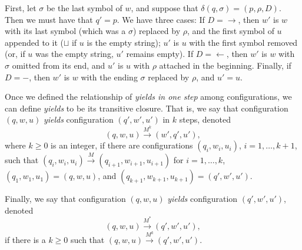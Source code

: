 \documentclass[12pt]{article}
\newcommand{\ra}{\rightarrow}
\newcommand{\la}{\leftarrow}
\begin{document}
First, let $\sigma$ be the last symbol of $w$, and suppose that $\delta(q, \sigma) = (p, \rho, D)$. Then we must have that $q' = p$. We have three cases:
If $D = \ra$, then $w'$ is $w$ with its last symbol (which was a $\sigma$) replaced by $\rho$, and the first symbol of $u$ appended to it ($\sqcup$ if $u$ is the empty string); $u'$ is $u$ with the first symbol removed (or, if $u$ was the empty string, $u'$ remains empty).
If $D = \la$, then $w'$ is $w$ with $\sigma$ omitted from its end, and $u'$ is $u$ with $\rho$ attached in the beginning.
Finally, if $D = -$, then $w'$ is $w$ with the ending $\sigma$ replaced by $\rho$, and $u' = u$.

Once we defined the relationship of \textit{yields in one step} among configurations, we can define \textit{yields} to be its transitive closure. That is, we say that configuration $(q, w, u)$ \textit{yields} configuration $(q', w', u')$ in $k$ steps, denoted 
$$(q, w, u) \xrightarrow{M^k} (w', q', u'),$$ 
where $k \geq 0$ is an integer, if there are configurations $(q_i, w_i, u_i)$, $i = 1, \ldots, k + 1$, such that $(q_i, w_i, u_i) \xrightarrow{M} (q_{i+1}, w_{i+1}, u_{i+1})$ for $i = 1, \ldots, k$, $(q_1, w_1, u_1) = (q, w, u)$, and $(q_{k+1}, w_{k+1}, u_{k+1}) = (q', w', u')$. 

Finally, we say that configuration $(q, w, u)$ \textit{yields} configuration $(q', w', u')$, denoted 
$$(q, w, u) \xrightarrow{M^*} (q', w', u'),$$ 
if there is a $k \geq 0$ such that $(q, w, u) \xrightarrow{M^k} (q', w', u')$. 
\end{document}
